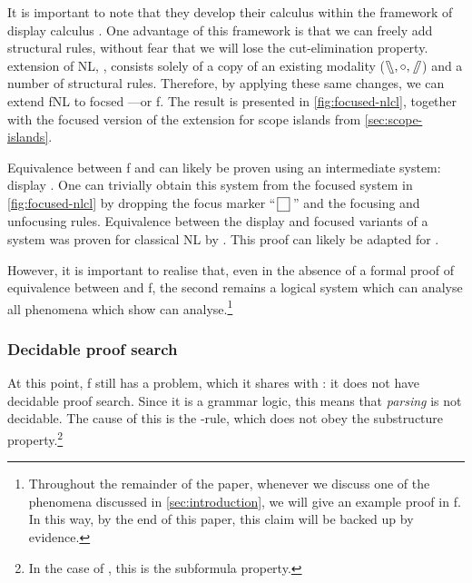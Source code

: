 \documentclass[10pt,a4paper]{llncs}
\begin{document}
It is important to note that they develop their calculus within the
framework of display calculus \citep{belnap1982}.
One advantage of this framework is that we can freely add structural
rules, without fear that we will lose the cut-elimination property.
 extension of NL, {\NLCL}, consists solely of a copy
of an existing modality ($\fatbslash,\mathbin{\circ},\mathbin{\!\fatslash\,}$) and a number of
structural rules.
Therefore, by applying these same changes, we can extend fNL to focsed
{\NLCL}---or {f\NLCL}.
The result is presented in \autoref{fig:focused-nlcl},
together with the focused version of the extension for scope islands
from \autoref{sec:scope-islands}.



Equivalence between {f\NLCL} and {\NLCL} can likely be proven using
an intermediate system: display {\NLCL}. One can trivially obtain this
system from the focused system in \autoref{fig:focused-nlcl} by
dropping the focus marker ``$\,\boxed{ \phantom{\cdot} }\,$'' and the
focusing and unfocusing rules.
Equivalence between the display and focused variants of a system was
proven for classical NL by \citet{bastenhof2011}.
This proof can likely be adapted for {\NLCL}.


However, it is important to realise that, even in the absence of a
formal proof of equivalence between {\NLCL} and {f\NLCL}, the second
remains a logical system which can analyse all phenomena which
\citet{barker2015} show {\NLCL} can analyse.\footnote{%
  Throughout the remainder of the paper, whenever we discuss one of
  the phenomena discussed in \autoref{sec:introduction}, we will give
  an example proof in {f\NLCL}. In this way, by the end of this paper,
  this claim will be backed up by evidence.
}

\subsubsection{Decidable proof search}%
\label{sec:decidable-proof-search}

At this point, {f\NLCL} still has a problem, which it shares with
{\NLCL}: it does not have decidable proof search.
Since it is a grammar logic, this means that \emph{parsing} is not
decidable.
The cause of this is the \I-rule, which does not obey the substructure
property.\footnote{%
  In the case of {\NLCL}, this is the subformula property.
}
\end{document}
